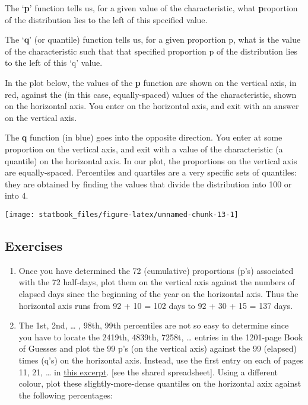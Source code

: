 \documentclass[]{book}
\begin{document}
The `\textbf{p}' function tells us, for a given value of the characteristic, what \textbf{p}roportion of the distribution lies to the left of this specified value.

The `\textbf{q}' (or quantile) function tells us, for a given proportion p, what is the value of the characteristic such that that specified proportion p of the distribution lies to the left of this `q' value.

In the plot below, the values of the \textbf{p} function are shown on the vertical axis, in red, against the (in this case, equally-spaced) values of the characteristic, shown on the horizontal axis. You enter on the horizontal axis, and exit with an answer on the vertical axis.

The \textbf{q} function (in blue) goes into the opposite direction. You enter at some proportion on the vertical axis, and exit with a value of the characteristic (a quantile) on the horizontal axis. In our plot, the proportions on the vertical axis are equally-spaced. Percentiles and quartiles are a very specific sets of quantiles: they are obtained by finding the values that divide the distribution into 100 or into 4.

\begin{center}\texttt{[image: statbook\_files/figure-latex/unnamed-chunk-13-1]} \end{center}

\hypertarget{exercises-1}{%
\subsection{Exercises}\label{exercises-1}}

\begin{enumerate}
\def\labelenumi{\arabic{enumi}.}
\item
  Once you have determined the 72 (cumulative) proportions (p's) associated with the 72 half-days, plot them on the vertical axis against the numbers of elapsed days since the beginning of the year on the horizontal axis. Thus the horizontal axis runs from 92 + 10 = 102 days to 92 + 30 + 15 = 137 days.
\item
  The 1st, 2nd, \ldots{} , 98th, 99th percentiles are not so easy to determine since you have to locate the 2419th, 4839th, 7258t, \ldots{} entries in the 1201-page Book of Guesses and plot the 99 p's (on the vertical axis) against the 99 (elapsed) times (q's) on the horizontal axis. Instead, use the first entry on each of pages 11, 21, \ldots{} in
  \href{http://www.biostat.mcgill.ca/hanley/bios691/SampledPages.pdf}{this excerpt}. {[}see the shared spreadsheet{]}. Using a different colour, plot these slightly-more-dense quantiles on the horizontal axix against the following percentages:
\end{enumerate}
\end{document}
